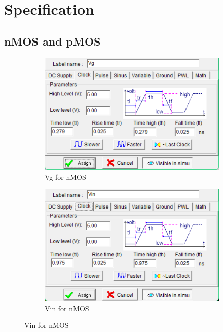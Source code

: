 \documentclass[a4paper,12pt]{article}
\begin{document}
	
	
	\clearpage
	
	
	
	\section{Specification}
	
	\subsection{nMOS and pMOS}
	
	\begin{figure}[H]
		\centering
		\begin{subfigure}[t]{0.49\textwidth}
			\centering
			\includegraphics[width=.75\textwidth , height=.15\textheight]{Images/nmos/nspec1.png}
			\caption{Vg for nMOS}
			\label{fig:3-a}
		\end{subfigure}
		\hfill
		\begin{subfigure}[t]{0.49\textwidth}
			\centering
			\includegraphics[width=.75\textwidth, height=0.15\textheight]{Images/nmos/nspec2.1.png}
			\caption{Vin for nMOS}
			\label{fig:3-b}
		\end{subfigure}
		
		\vspace{1em}
		

\end{figure}
\end{document}

